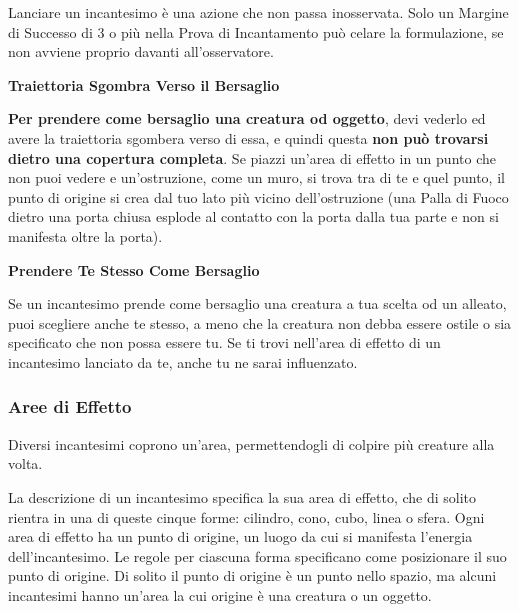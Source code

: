 \documentclass[12pt,a4paper,twoside,openany]{book}
\begin{document}
\begin{multicols}{2}
Lanciare un incantesimo è una azione che non passa inosservata. Solo un Margine di Successo di 3 o più nella Prova di Incantamento può celare la formulazione, se non avviene proprio davanti all'osservatore.

\textbf{Traiettoria Sgombra Verso il Bersaglio}

\textbf{Per prendere come bersaglio una creatura od oggetto}, devi vederlo ed avere la traiettoria sgombera verso di essa, e quindi questa \textbf{non può trovarsi dietro una copertura completa}. Se piazzi un'area di effetto in un punto che non puoi vedere e un'ostruzione, come un muro, si trova tra di te e quel punto, il punto di origine si crea dal tuo lato più vicino dell'ostruzione (una Palla di Fuoco dietro una porta chiusa esplode al contatto con la porta dalla tua parte e non si manifesta oltre la porta).

\textbf{Prendere Te Stesso Come Bersaglio}

Se un incantesimo prende come bersaglio una creatura a tua scelta od un alleato, puoi scegliere anche te stesso, a meno che la creatura non debba essere ostile o sia specificato che non possa essere tu. Se ti trovi nell'area di effetto di un incantesimo lanciato da te, anche tu ne sarai influenzato.

%

\subsubsection{Aree di Effetto}\label{magieareedieffetto}

Diversi incantesimi coprono un'area, permettendogli di colpire più creature alla volta.

La descrizione di un incantesimo specifica la sua area di effetto, che di solito rientra in una di queste cinque forme: cilindro, cono, cubo, linea o sfera. Ogni area di effetto ha un punto di origine, un luogo da cui si manifesta l'energia dell'incantesimo. Le regole per ciascuna forma specificano come posizionare il suo punto di origine. Di solito il punto di origine è un punto nello spazio, ma alcuni incantesimi hanno un'area la cui origine è una creatura o un oggetto.


\end{multicols}
\end{document}
